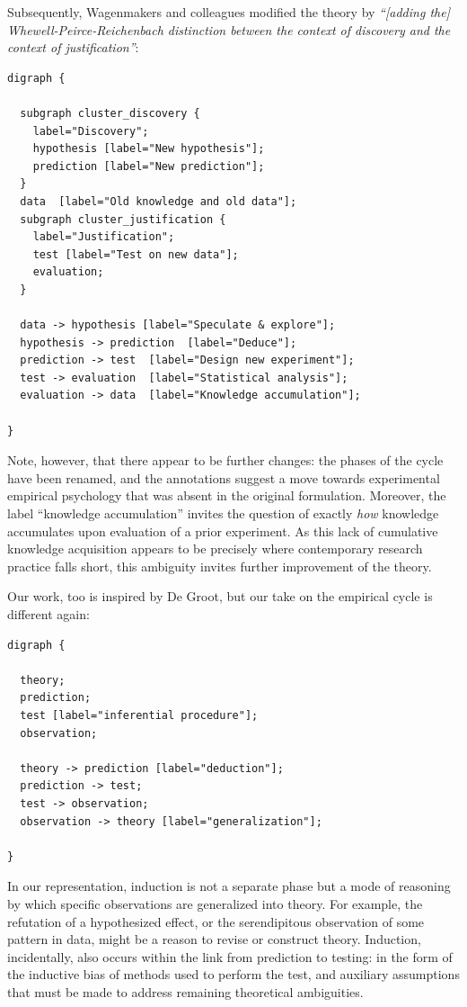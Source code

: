 \documentclass[
  man]{apa6}
\begin{document}
Subsequently, Wagenmakers and colleagues modified the theory by \emph{``{[}adding the{]} Whewell-Peirce-Reichenbach distinction between the context of discovery and the context of justification''}:

\begin{verbatim}
digraph {

  subgraph cluster_discovery {
    label="Discovery";
    hypothesis [label="New hypothesis"];
    prediction [label="New prediction"];
  }
  data  [label="Old knowledge and old data"];      
  subgraph cluster_justification {
    label="Justification";
    test [label="Test on new data"];
    evaluation;
  }

  data -> hypothesis [label="Speculate & explore"];
  hypothesis -> prediction  [label="Deduce"];
  prediction -> test  [label="Design new experiment"];
  test -> evaluation  [label="Statistical analysis"];
  evaluation -> data  [label="Knowledge accumulation"];

}
\end{verbatim}

Note, however, that there appear to be further changes:
the phases of the cycle have been renamed,
and the annotations suggest a move towards experimental empirical psychology that was absent in the original formulation.
Moreover, the label ``knowledge accumulation'' invites the question of exactly \emph{how} knowledge accumulates upon evaluation of a prior experiment.
As this lack of cumulative knowledge acquisition appears to be precisely where contemporary research practice falls short, this ambiguity invites further improvement of the theory.

Our work, too is inspired by De Groot, but our take on the empirical cycle is different again:

\begin{verbatim}
digraph {

  theory;
  prediction;
  test [label="inferential procedure"];
  observation;
  
  theory -> prediction [label="deduction"];
  prediction -> test;
  test -> observation;
  observation -> theory [label="generalization"];

}
\end{verbatim}

In our representation,
induction is not a separate phase but a mode of reasoning by which specific observations are generalized into theory.
For example, the refutation of a hypothesized effect,
or the serendipitous observation of some pattern in data,
might be a reason to revise or construct theory.
Induction, incidentally, also occurs within the link from prediction to testing:
in the form of the inductive bias of methods used to perform the test,
and auxiliary assumptions that must be made to address remaining theoretical ambiguities.
\end{document}
